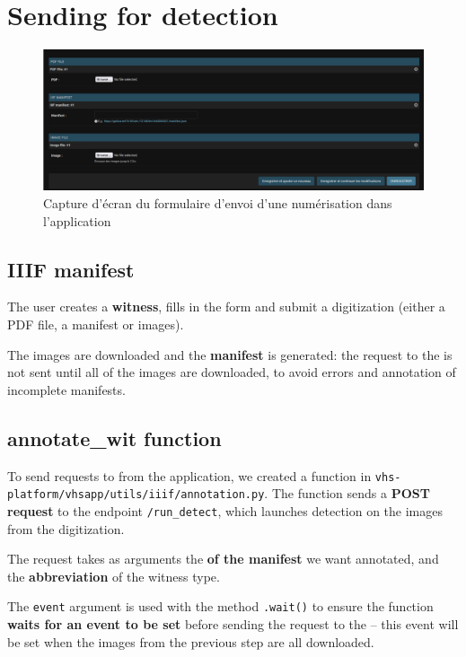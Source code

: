\section{Sending for detection}
	\begin{figure}[h]
	\centering
	\includegraphics[width=15cm]{images/eida_send_manifest.png}
	\caption{Capture d'écran du formulaire d'envoi d'une numérisation dans l'application \eida}
	\label{fig:eida_send_manifest}
	\end{figure}

	\subsection{IIIF manifest}
	The user creates a \textbf{witness}, fills in the form and submit a digitization (either a PDF file, a \iiif manifest or images).

	The images are downloaded and the \textbf{\eida \iiif manifest} is generated: the request to the \api is not sent until all of the images are downloaded, to avoid errors and annotation of incomplete manifests.

	\subsection{annotate\_wit function}
	To send requests to \exapi from the \eida application, we created a function in \texttt{vhs-platform/vhsapp/utils/iiif/annotation.py}. The function sends a \textbf{POST request} to the \api endpoint \texttt{/run\_detect}, which launches detection on the images from the digitization.
	
	The request takes as arguments the \textbf{\URL of the manifest} we want annotated, and the \textbf{abbreviation} of the witness type.
	
	The \texttt{event} argument is used with the method \texttt{.wait()} to ensure the function \textbf{waits for an event to be set} before sending the request to the \api – this event will be set when the images from the previous step are all downloaded.
	
